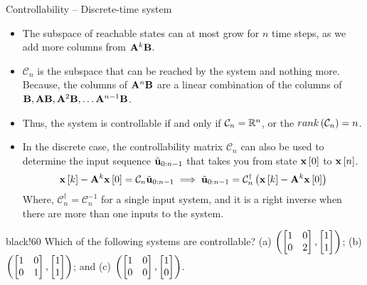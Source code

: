\documentclass[aspectratio=169]{beamer}
\def\mf{\ensuremath\mathbf}
\def\mb{\ensuremath\mathbb}
\def\lp{\ensuremath\left(}
\def\rp{\ensuremath\right)}
\def\ls{\ensuremath\left[}
\def\rs{\ensuremath\right]}
\def\bmx{\ensuremath\begin{bmatrix*}[r]}
\def\emx{\ensuremath\end{bmatrix*}}
\newcommand{\demoex}[2]{\onslide<#1->\begin{color}{black!60} #2 \end{color}}
\newcommand{\ct}[1]{\lp #1\rp}
\newcommand{\dt}[1]{\ls #1\rs}
\begin{document}
\begin{frame}{Controllability -- Discrete-time system}
\begin{itemize}
    \item The subspace of reachable states can at most grow for $n$ time steps, as we add more columns from $\mf{A}^k\mf{B}$.

    \item $\mathcal{C}_{n}$ is the subspace that can be reached by the system and nothing more. Because, the columns of $\mf{A}^n\mf{B}$ are a linear combination of the columns of $\mf{B}, \mf{A}\mf{B}, \mf{A}^2\mf{B}, \ldots \mf{A}^{n-1}\mf{B}$.

    \item Thus, the system is controllable if and only if $\mathcal{C}_{n} = \mb{R}^n$, or the $rank \ct{\mathcal{C}_n} = n$.

    \item In the discrete case, the controllability matrix $\mathcal{C}_n$ can also be used to determine the input sequence $\tilde{\mf{u}}_{0:n-1}$ that takes you from state $\mf{x}\dt{0}$ to $\mf{x}\dt{n}$.
    \[ \mf{x}\dt{k} - \mf{A}^{k}\mf{x}\dt{0} = \mathcal{C}_n \tilde{\mf{u}}_{0:n-1} \implies \tilde{\mf{u}}_{0:n-1} = \mathcal{C}_n^{\dagger} \ct{\mf{x}\dt{k} - \mf{A}^{k}\mf{x}\dt{0}} \]
    Where, $\mathcal{C}_n^\dagger = \mathcal{C}_n^{-1}$ for a single input system, and it is a right inverse when there are more than one inputs to the system.
\end{itemize}
\demoex{2}{\footnotesize Which of the following systems are controllable? (a) $\ct{\bmx 1 & 0 \\ 0 & 2 \emx, \bmx 1 \\ 1\emx}$; (b) $\ct{\bmx 1 & 0 \\ 0 & 1 \emx, \bmx 1 \\ 1\emx}$; and (c) $\ct{\bmx 1 & 0 \\ 0 & 0 \emx, \bmx 1\\ 0\emx}$.}
\end{frame}
 
\end{document}
